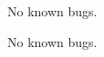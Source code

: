 
\begin{DoxyRefList}
\item[\label{bug__bug000001}%
\hypertarget{bug__bug000001}{}%
File \hyperlink{main_8c}{main.c} ]No known bugs. 

No known bugs. 
\end{DoxyRefList}